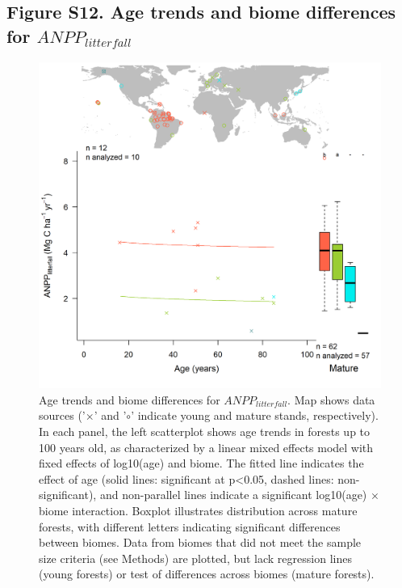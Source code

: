 \documentclass[
]{article}
\begin{document}
\newpage

\hypertarget{figure-s12.-age-trends-and-biome-differences-for-anpp_litterfall}{%
\subsection{\texorpdfstring{Figure S12. Age trends and biome differences
for
\(ANPP_{litterfall}\)}{Figure S12. Age trends and biome differences for ANPP\_\{litterfall\}}}\label{figure-s12.-age-trends-and-biome-differences-for-anpp_litterfall}}

\begin{figure}[H]

{\centering \includegraphics[width=1\linewidth]{tables_figures/age_trends/ANPP_litterfall_with_map} 

}

\caption{Age trends and biome differences for $ANPP_{litterfall}$. Map shows data sources ('$\times$' and '$\circ$' indicate young and mature stands, respectively). In each panel, the left scatterplot shows age trends in forests up to 100 years old, as characterized by a linear mixed effects model with fixed effects of log10(age) and biome. The fitted line indicates the effect of age (solid lines: significant at p<0.05, dashed lines: non-significant), and non-parallel lines indicate a significant log10(age) $\times$ biome interaction. Boxplot illustrates distribution across mature forests, with different letters indicating significant differences between biomes. Data from biomes that did not meet the sample size criteria (see Methods) are plotted, but lack regression lines (young forests) or test of differences across biomes (mature forests).}\label{fig:unnamed-chunk-15}
\end{figure}
\end{document}
